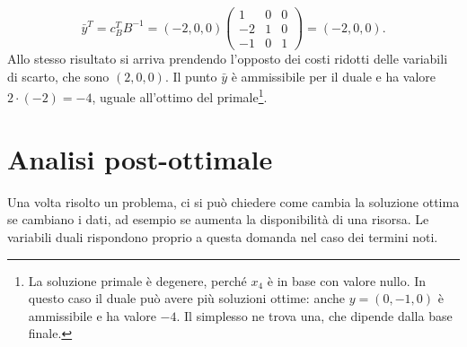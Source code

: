 \[
\bar{y}^T = c_B^T B^{-1} = (-2, 0, 0) \begin{pmatrix} 1 & 0 & 0 \\ -2 & 1 & 0 \\ -1 & 0 & 1 \end{pmatrix} = (-2, 0, 0).
\]
Allo stesso risultato si arriva prendendo l'opposto dei costi ridotti delle variabili di scarto, che sono $(2, 0, 0)$. Il punto $\bar{y}$ è ammissibile per il duale e ha valore $2 \cdot (-2) = -4$, uguale all'ottimo del primale\footnote{La soluzione primale è degenere, perché $x_4$ è in base con valore nullo. In questo caso il duale può avere più soluzioni ottime: anche $y = (0, -1, 0)$ è ammissibile e ha valore $-4$. Il simplesso ne trova una, che dipende dalla base finale.}.

\section{Analisi post-ottimale}\label{sec:post-ottimale}
Una volta risolto un problema, ci si può chiedere come cambia la soluzione ottima se cambiano i dati, ad esempio se aumenta la disponibilità di una risorsa. Le variabili duali rispondono proprio a questa domanda nel caso dei termini noti.

